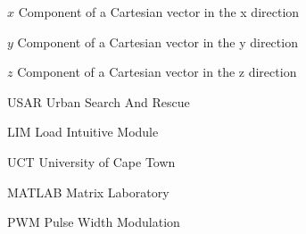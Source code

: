 \begin{Nomencl}[1cm]
    \item[$x$] Component of a Cartesian vector in the x direction
    \item[$y$] Component of a Cartesian vector in the y direction
    \item[$z$] Component of a Cartesian vector in the z direction

\end{Nomencl}

\begin{Nomencl}[1cm]
    \item[USAR] Urban Search And Rescue
    \item[LIM] Load Intuitive Module
    \item[UCT] University of Cape Town
    \item[MATLAB] Matrix Laboratory
    \item[PWM] Pulse Width Modulation

\end{Nomencl}

